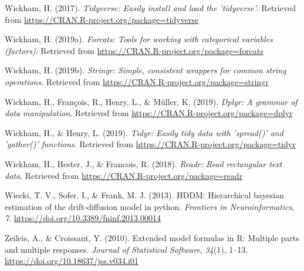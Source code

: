 \documentclass[
  english,
  man]{apa6}
\begin{document}
\leavevmode\hypertarget{ref-R-tidyverse}{}%
Wickham, H. (2017). \emph{Tidyverse: Easily install and load the 'tidyverse'}. Retrieved from \url{https://CRAN.R-project.org/package=tidyverse}

\leavevmode\hypertarget{ref-R-forcats}{}%
Wickham, H. (2019a). \emph{Forcats: Tools for working with categorical variables (factors)}. Retrieved from \url{https://CRAN.R-project.org/package=forcats}

\leavevmode\hypertarget{ref-R-stringr}{}%
Wickham, H. (2019b). \emph{Stringr: Simple, consistent wrappers for common string operations}. Retrieved from \url{https://CRAN.R-project.org/package=stringr}

\leavevmode\hypertarget{ref-R-dplyr}{}%
Wickham, H., François, R., Henry, L., \& Müller, K. (2019). \emph{Dplyr: A grammar of data manipulation}. Retrieved from \url{https://CRAN.R-project.org/package=dplyr}

\leavevmode\hypertarget{ref-R-tidyr}{}%
Wickham, H., \& Henry, L. (2019). \emph{Tidyr: Easily tidy data with 'spread()' and 'gather()' functions}. Retrieved from \url{https://CRAN.R-project.org/package=tidyr}

\leavevmode\hypertarget{ref-R-readr}{}%
Wickham, H., Hester, J., \& Francois, R. (2018). \emph{Readr: Read rectangular text data}. Retrieved from \url{https://CRAN.R-project.org/package=readr}

\leavevmode\hypertarget{ref-wiecki_hddm_2013}{}%
Wiecki, T. V., Sofer, I., \& Frank, M. J. (2013). HDDM: Hierarchical bayesian estimation of the drift-diffusion model in python. \emph{Frontiers in Neuroinformatics}, \emph{7}. \url{https://doi.org/10.3389/fninf.2013.00014}

\leavevmode\hypertarget{ref-R-Formula}{}%
Zeileis, A., \& Croissant, Y. (2010). Extended model formulas in R: Multiple parts and multiple responses. \emph{Journal of Statistical Software}, \emph{34}(1), 1--13. \url{https://doi.org/10.18637/jss.v034.i01}

\endgroup
\end{document}
